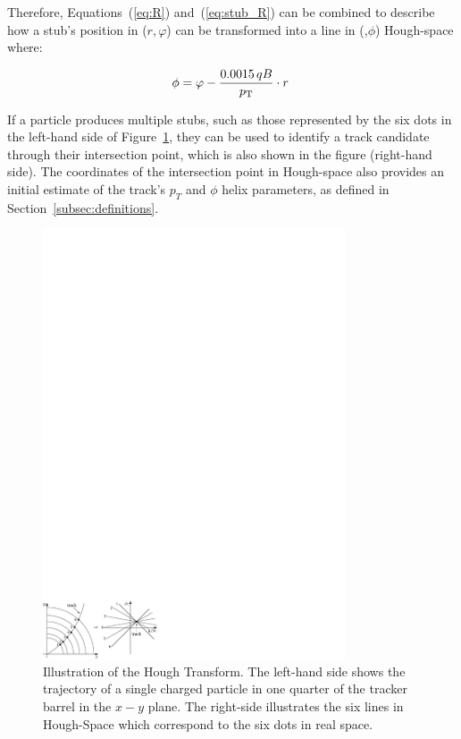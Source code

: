 Therefore, Equations~(\ref{eq:R}) and~(\ref{eq:stub_R}) can be combined to describe how a stub's position in ($r, \varphi$) can be transformed into a line in (\qpt,$\phi$) Hough-space where:

\begin{equation}
\phi = \varphi - \frac{0.0015\,qB}{p_{\mathrm{T}}}\cdot r \;
\label{eq:localHT}
\end{equation}

If a particle produces multiple stubs, such as those represented by the six dots in the left-hand side of Figure~\ref{fig:HT}, they can be used to identify a track candidate through their intersection point, which is also shown in the figure (right-hand side).
The coordinates of the intersection point in Hough-space also provides an initial estimate of the track's $p_{T}$ and $\phi$ helix parameters, as defined in Section~\ref{subsec:definitions}.

\begin{figure}[!h]
\centering
\includegraphics[width=0.80\textwidth]{figs/tk-upgrade/HT.pdf}
\caption{Illustration of the Hough Transform. The left-hand side shows the trajectory of a single charged particle in one quarter of the tracker barrel in the $x-y$ plane. The right-side illustrates the six lines in Hough-Space which correspond to the six dots in real space.}
\label{fig:HT}
\end{figure}


